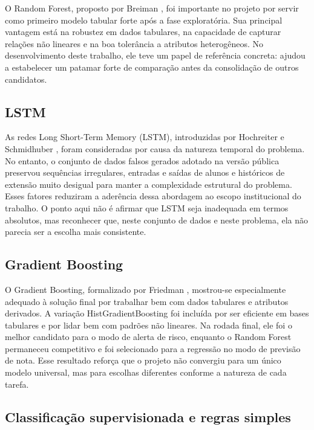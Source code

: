 O Random Forest, proposto por Breiman \cite{breiman2001}, foi importante no projeto por servir como primeiro modelo tabular forte ap\'os a fase explorat\'oria. Sua principal vantagem est\'a na robustez em dados tabulares, na capacidade de capturar rela\c{c}\~oes n\~ao lineares e na boa toler\^ancia a atributos heterog\^eneos. No desenvolvimento deste trabalho, ele teve um papel de refer\^encia concreta: ajudou a estabelecer um patamar forte de compara\c{c}\~ao antes da consolida\c{c}\~ao de outros candidatos.

\subsection{LSTM}
\label{subsec:lstm}

As redes Long Short-Term Memory (LSTM), introduzidas por Hochreiter e Schmidhuber \cite{hochreiter1997}, foram consideradas por causa da natureza temporal do problema. No entanto, o conjunto de dados falsos gerados adotado na vers\~ao p\'ublica preservou sequ\^encias irregulares, entradas e sa\'idas de alunos e hist\'oricos de extens\~ao muito desigual para manter a complexidade estrutural do problema. Esses fatores reduziram a ader\^encia dessa abordagem ao escopo institucional do trabalho. O ponto aqui n\~ao \'e afirmar que LSTM seja inadequada em termos absolutos, mas reconhecer que, neste conjunto de dados e neste problema, ela n\~ao parecia ser a escolha mais consistente.

\subsection{Gradient Boosting}
\label{subsec:gradient-boosting}

O Gradient Boosting, formalizado por Friedman \cite{friedman2001}, mostrou-se especialmente adequado \`a solu\c{c}\~ao final por trabalhar bem com dados tabulares e atributos derivados. A varia\c{c}\~ao HistGradientBoosting foi inclu\'ida por ser eficiente em bases tabulares e por lidar bem com padr\~oes n\~ao lineares. Na rodada final, ele foi o melhor candidato para o modo de alerta de risco, enquanto o Random Forest permaneceu competitivo e foi selecionado para a regress\~ao no modo de previs\~ao de nota. Esse resultado refor\c{c}a que o projeto n\~ao convergiu para um \'unico modelo universal, mas para escolhas diferentes conforme a natureza de cada tarefa.

\subsection{Classifica\c{c}\~ao supervisionada e regras simples}
\label{subsec:classificacao-regras}

